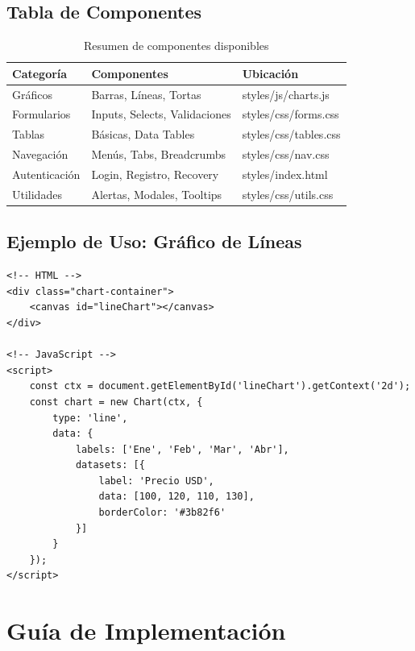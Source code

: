 \documentclass[a4paper,12pt]{article}
\begin{document}
\subsection{Tabla de Componentes}
\begin{table}[H]
    \centering
    \begin{tabular}{|l|l|l|}
        \hline
        \textbf{Categoría} & \textbf{Componentes} & \textbf{Ubicación} \\ \hline
        Gráficos & Barras, Líneas, Tortas & styles/js/charts.js \\ \hline
        Formularios & Inputs, Selects, Validaciones & styles/css/forms.css \\ \hline
        Tablas & Básicas, Data Tables & styles/css/tables.css \\ \hline
        Navegación & Menús, Tabs, Breadcrumbs & styles/css/nav.css \\ \hline
        Autenticación & Login, Registro, Recovery & styles/index.html \\ \hline
        Utilidades & Alertas, Modales, Tooltips & styles/css/utils.css \\ \hline
    \end{tabular}
    \caption{Resumen de componentes disponibles}
    \label{tab:componentes}
\end{table}

\subsection{Ejemplo de Uso: Gráfico de Líneas}
\begin{lstlisting}[caption=Ejemplo de implementación de gráfico]
<!-- HTML -->
<div class="chart-container">
    <canvas id="lineChart"></canvas>
</div>

<!-- JavaScript -->
<script>
    const ctx = document.getElementById('lineChart').getContext('2d');
    const chart = new Chart(ctx, {
        type: 'line',
        data: {
            labels: ['Ene', 'Feb', 'Mar', 'Abr'],
            datasets: [{
                label: 'Precio USD',
                data: [100, 120, 110, 130],
                borderColor: '#3b82f6'
            }]
        }
    });
</script>
\end{lstlisting}

\section{Guía de Implementación}
\end{document}

